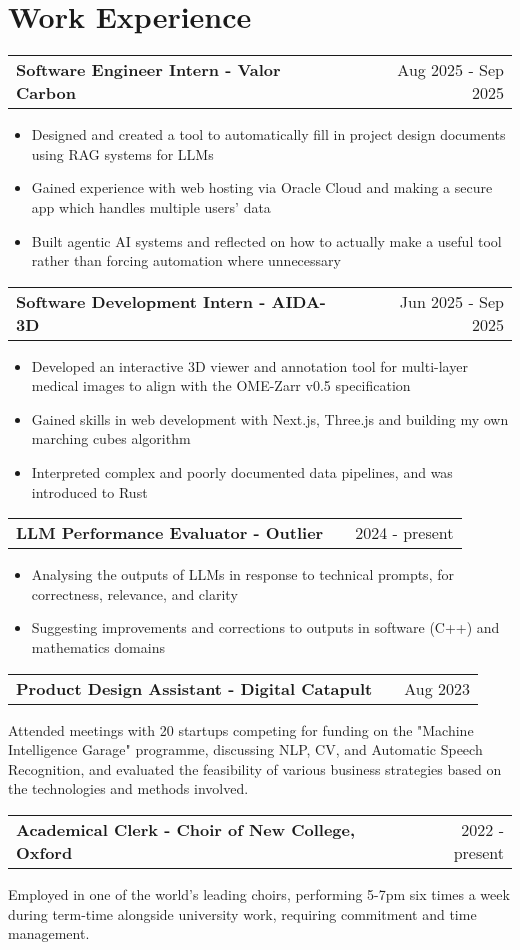 \documentclass[a4paper,12pt]{article}
\makeatletter
\newenvironment{jobshort}[2]
    {
    \begin{tabularx}{\linewidth}{@{}l X r@{}}
    \textbf{#1} & \hfill &  #2 \\[3.75pt]
    \end{tabularx}
    }
    {
    }
\newenvironment{joblong}[2]
    {
    \begin{tabularx}{\linewidth}{@{}l X r@{}}
    \textbf{#1} & \hfill &  #2 \\[3.75pt]
    \end{tabularx}
    \begin{minipage}[t]{\linewidth}
    \begin{itemize}[nosep,after=\strut, leftmargin=1em, itemsep=3pt,label=--]
    }
    {
    \end{itemize}
    \end{minipage}    
    }
\makeatother
\begin{document}
\section{Work Experience}

\begin{joblong}{Software Engineer Intern - Valor Carbon}{Aug 2025 - Sep 2025}
\item Designed and created a tool to automatically fill in project design documents using RAG systems for LLMs
\item Gained experience with web hosting via Oracle Cloud and making a secure app which handles multiple users' data
\item Built agentic AI systems and reflected on how to actually make a useful tool rather than forcing automation where unnecessary
\end{joblong}

\begin{joblong}{Software Development Intern - AIDA-3D}{Jun 2025 - Sep 2025}
\item Developed an interactive 3D viewer and annotation tool for multi-layer medical images to align with the OME-Zarr v0.5 specification
\item Gained skills in web development with Next.js, Three.js and building my own marching cubes algorithm
\item Interpreted complex and poorly documented data pipelines, and was introduced to Rust
\end{joblong}

\begin{joblong}{LLM Performance Evaluator - Outlier}{2024 - present}
\item Analysing the outputs of LLMs in response to technical prompts, for correctness, relevance, and clarity
\item Suggesting improvements and corrections to outputs in software (C++) and mathematics domains
\end{joblong}

\begin{jobshort}{Product Design Assistant - Digital Catapult}{Aug 2023}
Attended meetings with 20 startups competing for funding on the "Machine Intelligence Garage" programme, discussing NLP, CV, and Automatic Speech Recognition, and evaluated the feasibility of various business strategies based on the technologies and methods involved.
\end{jobshort}

\begin{jobshort}{Academical Clerk - Choir of New College, Oxford}{2022 - present}
Employed in one of the world's leading choirs, performing 5-7pm six times a week during term-time alongside university work, requiring commitment and time management.
\end{jobshort}
  
\end{document}
